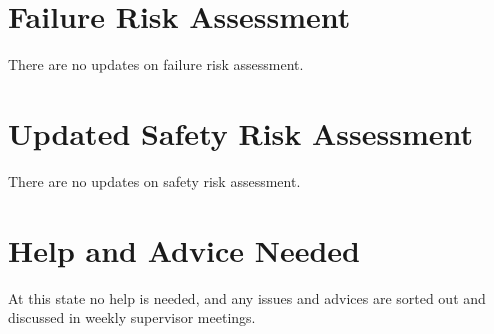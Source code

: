 \documentclass[a4paper,11pt]{article}
\begin{document}
\section{Failure Risk Assessment}
There are no updates on failure risk assessment. 

\section{Updated Safety Risk Assessment}
There are no updates on safety risk assessment.

\section{Help and Advice Needed}
At this state no help is needed, and any issues and advices are sorted out and discussed in weekly supervisor meetings.
\end{document}
